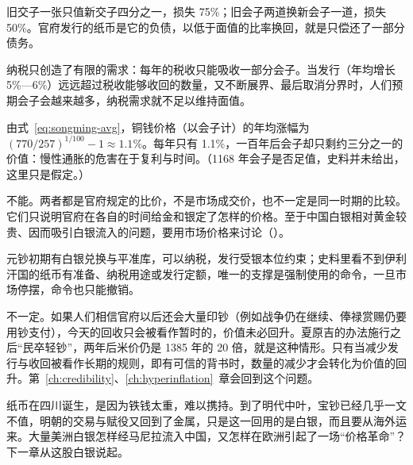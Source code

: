 \begin{answers}
\item 旧交子一张只值新交子四分之一，损失 75\%；旧会子两道换新会子一道，损失 50\%。官府发行的纸币是它的负债，以低于面值的比率换回，就是只偿还了一部分债务。
\item 纳税只创造了有限的需求：每年的税收只能吸收一部分会子。当发行（年均增长 5\%—6\%）远远超过税收能够收回的数量，又不断展界、最后取消分界时，人们预期会子会越来越多，纳税需求就不足以维持面值。
\item 由式~\eqref{eq:songming-avg}，铜钱价格（以会子计）的年均涨幅为 $(770/257)^{1/100}-1\approx1.1\%$。每年只有 1.1\%，一百年后会子却只剩约三分之一的价值：慢性通胀的危害在于复利与时间。（1168 年会子是否足值，史料并未给出，这里只是假定。）
\item 不能。两者都是官府规定的比价，不是市场成交价，也不一定是同一时期的比较。它们只说明官府在各自的时间给金和银定了怎样的价格。至于中国白银相对黄金较贵、因而吸引白银流入的问题，要用市场价格来讨论（）。
\item 元钞初期有白银兑换与平准库，可以纳税，发行受银本位约束；史料里看不到伊利汗国的纸币有准备、纳税用途或发行定额，唯一的支撑是强制使用的命令，一旦市场停摆，命令也只能撤销。
\item 不一定。如果人们相信官府以后还会大量印钞（例如战争仍在继续、俸禄赏赐仍要用钞支付），今天的回收只会被看作暂时的，价值未必回升。夏原吉的办法施行之后“民卒轻钞”，两年后米价仍是 1385 年的 20 倍，就是这种情形。只有当减少发行与收回被看作长期的规则，即有可信的背书时，数量的减少才会转化为价值的回升。第~\ref{ch:credibility}、\ref{ch:hyperinflation}~章会回到这个问题。
\end{answers}

纸币在四川诞生，是因为铁钱太重，难以携持。到了明代中叶，宝钞已经几乎一文不值，明朝的交易与赋役又回到了金属，只是这一回用的是白银，而且要从海外运来。大量美洲白银怎样经马尼拉流入中国，又怎样在欧洲引起了一场“价格革命”？下一章从这股白银说起。
